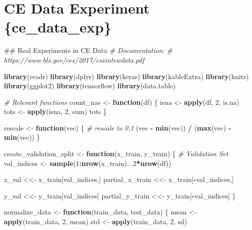 \documentclass[12pt,twoside]{reedthesis}
\newenvironment{Shaded}{\begin{snugshade}}{\end{snugshade}}
\newcommand{\KeywordTok}[1]{\textcolor[rgb]{0.13,0.29,0.53}{\textbf{#1}}}
\newcommand{\DecValTok}[1]{\textcolor[rgb]{0.00,0.00,0.81}{#1}}
\newcommand{\StringTok}[1]{\textcolor[rgb]{0.31,0.60,0.02}{#1}}
\newcommand{\CommentTok}[1]{\textcolor[rgb]{0.56,0.35,0.01}{\textit{#1}}}
\newcommand{\ControlFlowTok}[1]{\textcolor[rgb]{0.13,0.29,0.53}{\textbf{#1}}}
\newcommand{\OperatorTok}[1]{\textcolor[rgb]{0.81,0.36,0.00}{\textbf{#1}}}
\newcommand{\NormalTok}[1]{#1}
\begin{document}
\section{CE Data Experiment
\{ce\_data\_exp\}}\label{ce-data-experiment-ce_data_exp}
\begin{Shaded}
\begin{Highlighting}[]
\NormalTok{## Real Experiments in CE Data}
\CommentTok{# Documentation:}
\CommentTok{# https://www.bls.gov/cex/2017/csxintvwdata.pdf}

\KeywordTok{library}\NormalTok{(readr)}
\KeywordTok{library}\NormalTok{(dplyr)}
\KeywordTok{library}\NormalTok{(keras)}
\KeywordTok{library}\NormalTok{(kableExtra)}
\KeywordTok{library}\NormalTok{(knitr)}
\KeywordTok{library}\NormalTok{(ggplot2)}
\KeywordTok{library}\NormalTok{(tensorflow)}
\KeywordTok{library}\NormalTok{(data.table)}

\CommentTok{# Relevant functions}
\NormalTok{count_nas <-}\StringTok{ }\ControlFlowTok{function}\NormalTok{(df) \{}
\NormalTok{  isna <-}\StringTok{ }\KeywordTok{apply}\NormalTok{(df, }\DecValTok{2}\NormalTok{, is.na)}
\NormalTok{  tots <-}\StringTok{ }\KeywordTok{apply}\NormalTok{(isna, }\DecValTok{2}\NormalTok{, sum)}
\NormalTok{  tots}
\NormalTok{\}}

\NormalTok{rescale <-}\StringTok{ }\ControlFlowTok{function}\NormalTok{(vec) \{ }\CommentTok{# rescale to 0,1}
\NormalTok{  (vec }\OperatorTok{-}\StringTok{ }\KeywordTok{min}\NormalTok{(vec)) }\OperatorTok{/}\StringTok{ }\NormalTok{(}\KeywordTok{max}\NormalTok{(vec) }\OperatorTok{-}\StringTok{ }\KeywordTok{min}\NormalTok{(vec))}
\NormalTok{\}}

\NormalTok{create_validation_split <-}\StringTok{ }\ControlFlowTok{function}\NormalTok{(x_train, y_train) \{}
  \CommentTok{# Validation Set}
\NormalTok{  val_indices <-}\StringTok{ }\KeywordTok{sample}\NormalTok{(}\DecValTok{1}\OperatorTok{:}\KeywordTok{nrow}\NormalTok{(x_train), .}\DecValTok{2}\OperatorTok{*}\KeywordTok{nrow}\NormalTok{(df))}
  
\NormalTok{  x_val <<-}\StringTok{ }\NormalTok{x_train[val_indices,]}
\NormalTok{  partial_x_train <<-}\StringTok{ }\NormalTok{x_train[}\OperatorTok{-}\NormalTok{val_indices,]}
  
\NormalTok{  y_val <<-}\StringTok{ }\NormalTok{y_train[val_indices]}
\NormalTok{  partial_y_train <<-}\StringTok{ }\NormalTok{y_train[}\OperatorTok{-}\NormalTok{val_indices]}
\NormalTok{\}}

\NormalTok{normalize_data <-}\StringTok{ }\ControlFlowTok{function}\NormalTok{(train_data, test_data) \{}
\NormalTok{  mean <-}\StringTok{ }\KeywordTok{apply}\NormalTok{(train_data, }\DecValTok{2}\NormalTok{, mean)}
\NormalTok{  std <-}\StringTok{ }\KeywordTok{apply}\NormalTok{(train_data, }\DecValTok{2}\NormalTok{, sd)}
  

\end{Highlighting}
\end{Shaded}
\end{document}
